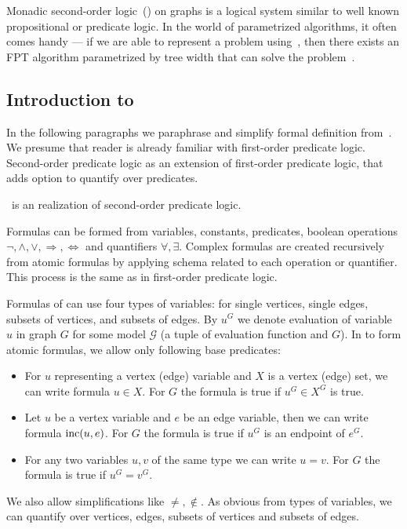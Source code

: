 Monadic second-order logic~(\MSO{}) on graphs is a logical system similar to
well known propositional or predicate logic.
In the world of parametrized algorithms,
it often comes handy --- if we are able to represent a problem using~\MSO{},
then there exists an FPT algorithm parametrized by tree width
that can solve the problem~\cite{tree_width_mso}.

\subsection{Introduction to~\MSO{}}

In the following paragraphs we paraphrase and simplify formal definition
from~\cite{book_parametrized_algorithms}.
We presume that reader is already familiar with first-order predicate logic.
Second-order predicate logic as an extension of first-order predicate logic,
that adds option to quantify over predicates.

\MSO{}~is an realization of second-order predicate logic.
\todo[inline]
{ TODO Switch to footnote, currently, it raises exceptions in NVim ;-P

	We need second-order logic as quantification over subsets of vertices or edges
	corresponds to quantification over predicates separating the subsets.
	Without this requirement we could talk
	about monadic first-order logic \( \text{MSO}_1 \).
}

Formulas can be formed from
variables, constants, predicates,
boolean operations \( \lnot, \land, \lor, \Rightarrow, \Leftrightarrow \)
and quantifiers \( \forall, \exists \).
Complex formulas are created recursively from atomic formulas
by applying schema related to each operation or quantifier.
This process is the same as in first-order predicate logic.

Formulas of \MSO{} can use four types of variables:
for single vertices, single edges, subsets of vertices, and subsets of edges.
By \( u^G \) we denote evaluation of variable \( u \) in graph \( G \)
for some model \( \mathcal{G} \) (a tuple of evaluation function and \( G \)).
In \MSO{} to form atomic formulas, we allow only following base predicates:
%
\begin{itemize}
	\item For \( u \) representing a vertex (edge) variable
	      and \( X \) is a vertex (edge) set,
	      we can write formula \( u \in X \).
	      For \( G \) the formula is true if \( u^G \in X^G \) is true.
	\item Let \( u \) be a vertex variable and \( e \) be an edge variable,
	      then we can write formula \( \text{inc} (u, e) \).
	      For \( G \) the formula is true if \( u^G \) is an endpoint of \( e^G \).
	\item For any two variables \( u, v \) of the same type we can write \( u = v \).
	      For \( G \) the formula is true if \( u^G = v^G \).
\end{itemize}
%
We also allow simplifications like \( \ne, \not\in \).
As obvious from types of variables, we can quantify over vertices, edges,
subsets of vertices and subsets of edges.

